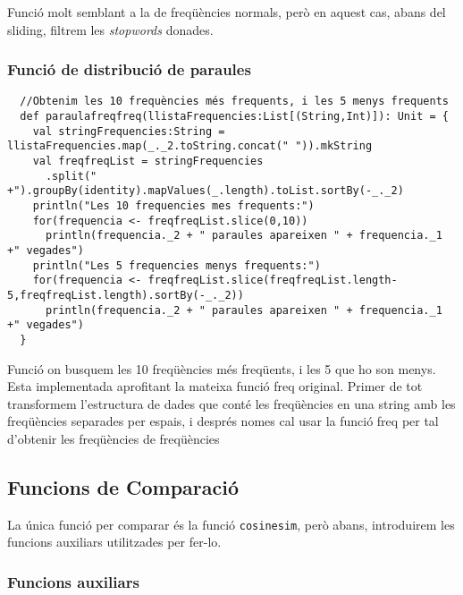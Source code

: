 \documentclass[11pt,a4paper,twoside]{report}
\begin{document}
Funció molt semblant a la de freqüències normals, però en aquest cas, abans del sliding, filtrem les \textit{stopwords} donades.

\subsubsection{Funció de distribució de paraules}
\begin{lstlisting}
  //Obtenim les 10 frequències més frequents, i les 5 menys frequents
  def paraulafreqfreq(llistaFrequencies:List[(String,Int)]): Unit = {
    val stringFrequencies:String = llistaFrequencies.map(_._2.toString.concat(" ")).mkString
    val freqfreqList = stringFrequencies
      .split(" +").groupBy(identity).mapValues(_.length).toList.sortBy(-_._2)
    println("Les 10 frequencies mes frequents:")
    for(frequencia <- freqfreqList.slice(0,10))
      println(frequencia._2 + " paraules apareixen " + frequencia._1 +" vegades")
    println("Les 5 frequencies menys frequents:")
    for(frequencia <- freqfreqList.slice(freqfreqList.length-5,freqfreqList.length).sortBy(-_._2))
      println(frequencia._2 + " paraules apareixen " + frequencia._1 +" vegades")
  }
\end{lstlisting}

Funció on busquem les 10 freqüències més freqüents, i les 5 que ho son menys. Esta implementada aprofitant la mateixa funció freq original. Primer de tot transformem l'estructura de dades que conté les freqüències en una string amb les freqüències separades per espais, i després nomes cal usar la funció freq per tal d'obtenir les freqüències de freqüències

\subsection{Funcions de Comparació}

La única funció per comparar és la funció \texttt{cosinesim}, però abans, introduirem les funcions auxiliars utilitzades per fer-lo.

\subsubsection{Funcions auxiliars}
\end{document}
